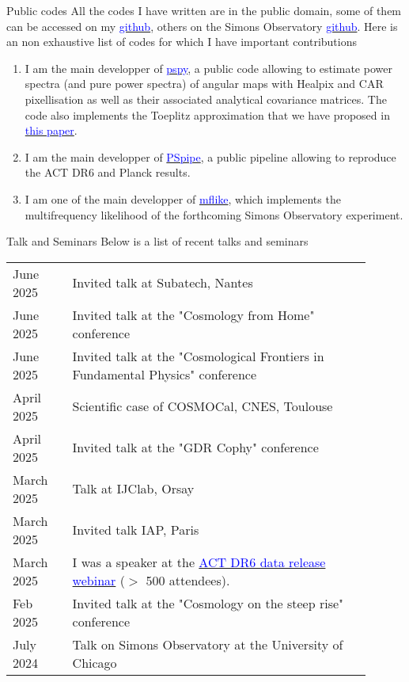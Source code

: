 \documentclass{resume} %
\newcommand{\TIB}[1]{\textcolor{blue}{#1}}
\begin{document}
\begin{rSection}{Public codes}
All the codes I have written are in the public domain, some of them can be accessed on my \href{https://github.com/thibautlouis}{\TIB{github}}, others on the Simons Observatory \href{https://github.com/simonobs}{\TIB{github}}. Here is an non exhaustive list of codes for which I have important contributions 
\begin{enumerate}
\item I am the main developper of \href{https://github.com/simonsobs/pspy}{\TIB{pspy}}, a public code allowing to estimate power spectra (and pure power spectra) of angular maps with Healpix and CAR pixellisation as well as their associated analytical covariance matrices. The code also implements the Toeplitz approximation that we have proposed in \href{https://ui.adsabs.harvard.edu/abs/2020PhRvD.102l3538L/abstract}{\TIB{this paper}}.
\item I am  the main developper of \href{https://github.com/simonsobs/PSpipe}{\TIB{PSpipe}}, a public pipeline  allowing to reproduce the ACT DR6 and Planck results. 
\item I am one of the main developper of \href{https://github.com/simonsobs/mflike}{\TIB{mflike}}, which implements the multifrequency likelihood of the forthcoming Simons Observatory experiment. 

\end{enumerate}

\end{rSection}

\begin{rSection}{Talk and Seminars }
Below is a list of recent talks and seminars 

\begin{table}[h]
{\def\arraystretch{1.5}\tabcolsep=0pt
\begin{tabular}{p{0.15\linewidth}p{0.75\linewidth}}
 June 2025 & Invited talk at Subatech, Nantes   \\
 June 2025 & Invited talk at the "Cosmology from Home" conference   \\
 June 2025 &  Invited talk at  the "Cosmological Frontiers in Fundamental Physics" conference   \\
 April 2025 & Scientific case of COSMOCal, CNES, Toulouse   \\
 April 2025 &   Invited talk at the "GDR Cophy" conference   \\
 March 2025 &  Talk at IJClab, Orsay   \\
 March 2025 &  Invited talk IAP, Paris   \\
 March 2025 &  I was a speaker at the  \href{https://www.youtube.com/watch?v=sETYHrDBXQg}{\TIB{ACT DR6 data release webinar}} ($>$ 500 attendees).     \\
 Feb 2025 & Invited talk at the "Cosmology on the steep rise" conference   \\
 July 2024 &  Talk on Simons Observatory at the University of Chicago 
\end{tabular}
}
\end{table}

\end{rSection}
\end{document}
